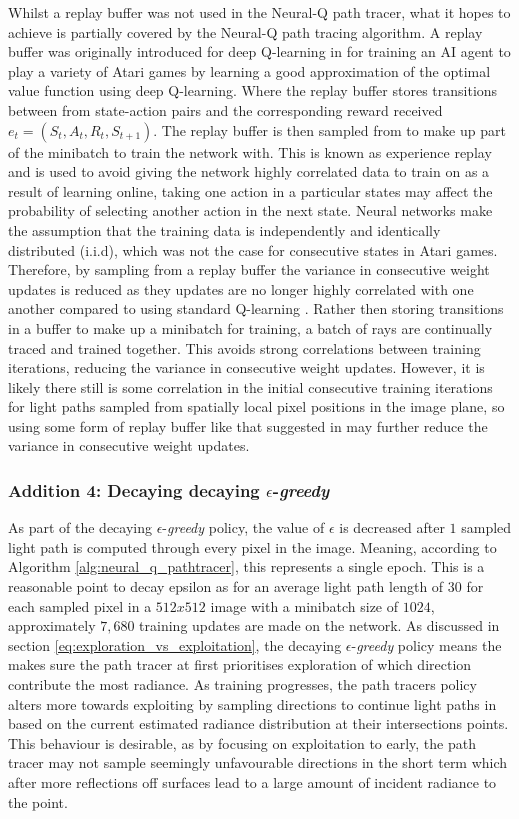 \documentclass[../dissertation.tex]{subfiles}
\begin{document}
Whilst a replay buffer was not used in the Neural-Q path tracer, what it hopes to achieve is partially covered by the Neural-Q path tracing algorithm. A replay buffer was originally introduced for deep Q-learning in \cite{mnih2013playing} for training an AI agent to play a variety of Atari games by learning a good approximation of the optimal value function using deep Q-learning. Where the replay buffer stores transitions between from state-action pairs and the corresponding reward received $e_t = (S_t, A_t, R_t, S_{t+1})$. The replay buffer is then sampled from to make up part of the minibatch to train the network with. This is known as experience replay and is used to avoid giving the network highly correlated data to train on as a result of learning online, taking one action  in a particular states may affect the probability of selecting another action in the next state. Neural networks make the assumption that the training data is independently and identically distributed (i.i.d), which was not the case for consecutive states in Atari games. Therefore, by sampling from a replay buffer the variance in consecutive weight updates is reduced as they updates are no longer highly correlated with one another compared to using standard Q-learning \cite{sutton2011reinforcement}. Rather then storing transitions in a buffer to make up a minibatch for training, a batch of rays are continually traced and trained together. This avoids strong correlations between training iterations, reducing the variance in consecutive weight updates. However, it is likely there still is some correlation in the initial consecutive training iterations for light paths sampled from spatially local pixel positions in the image plane, so using some form of replay buffer like that suggested in \cite{muller2018neural} may further reduce the variance in consecutive weight updates.

\subsubsection*{Addition 4: Decaying decaying $\epsilon$-\textit{greedy}}
As part of the decaying $\epsilon$-\textit{greedy} policy, the value of $\epsilon$ is decreased after $1$ sampled light path is computed through every pixel in the image. Meaning, according to Algorithm \ref{alg:neural_q_pathtracer}, this represents a single epoch. This is a reasonable point to decay epsilon as for an average light path length of $30$ for each sampled pixel in a $512x512$ image with a minibatch size of $1024$, approximately $7,680$ training updates are made on the network. As discussed in section \ref{eq:exploration_vs_exploitation}, the decaying $\epsilon$-\textit{greedy} policy means the makes sure the path tracer at first prioritises exploration of which direction contribute the most radiance. As training progresses, the path tracers policy alters more towards exploiting by sampling directions to continue light paths in based on the current estimated radiance distribution at their intersections points. This behaviour is desirable, as by focusing on exploitation to early, the path tracer may not sample seemingly unfavourable directions in the short term which after more reflections off surfaces lead to a large amount of incident radiance to the point.
\end{document}
